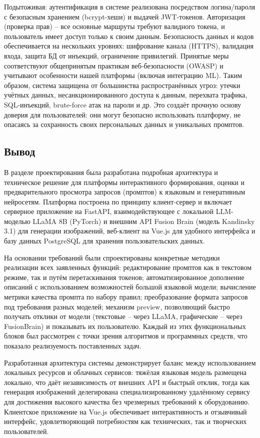 Подытоживая: аутентификация в системе реализована посредством логина/пароля с безопасным хранением (bcrypt-хеши) и выдачей JWT-токенов. Авторизация (проверка прав) – все основные маршруты требуют валидного токена, и пользователь имеет доступ только к своим данным. Безопасность данных и кодов обеспечивается на нескольких уровнях: шифрование канала (HTTPS), валидация входа, защита БД от инъекций, ограничение привилегий. Принятые меры соответствуют общепринятым практикам веб-безопасности (OWASP) и учитывают особенности нашей платформы (включая интеграцию ML). Таким образом, система защищена от большинства распространённых угроз: утечки учётных данных, несанкционированного доступа к данным, перехвата трафика, SQL-инъекций, brute-force атак на пароли и др. Это создаёт прочную основу доверия для пользователей: они могут безопасно использовать платформу, не опасаясь за сохранность своих персональных данных и уникальных промптов.
\subsection{Вывод}
В разделе проектирования была разработана подробная архитектура и техническое решение для платформы интерактивного формирования, оценки и предварительного просмотра запросов (промптов) к языковым и генеративным нейросетям. Платформа построена по принципу клиент-сервер и включает серверное приложение на FastAPI, взаимодействующее с локальной LLM-моделью LLaMA 8B (PyTorch) и внешним API Fusion Brain (модель Kandinsky 3.1) для генерации изображений, веб-клиент на Vue.js для удобного интерфейса и базу данных PostgreSQL для хранения пользовательских данных.

На основании требований были спроектированы конкретные методики реализации всех заявленных функций: редактирование промптов как в текстовом режиме, так и путём перетаскивания токенов; автоматизированное дополнение описаний с использованием возможностей большой языковой модели; вычисление метрики качества промпта по набору правил; преобразование формата запросов под требования разных моделей; механизм preview, позволяющий быстро получать отклики от модели (текстовые – через LLaMA, графические – через FusionBrain) и показывать их пользователю. Каждый из этих функциональных блоков был рассмотрен с точки зрения алгоритмов и программных средств, что показало реализуемость поставленных задач.

Разработанная архитектура системы демонстрирует баланс между использованием локальных ресурсов и облачных сервисов: тяжёлая языковая модель размещена локально, что даёт независимость от внешних API и быстрый отклик, тогда как генерация изображений делегирована специализированному удалённому сервису для достижения высокого качества без чрезмерных требований к оборудованию. Клиентское приложение на Vue.js обеспечивает интерактивность и отзывчивый интерфейс, удовлетворяющий потребностям как технических, так и творческих пользователей.

